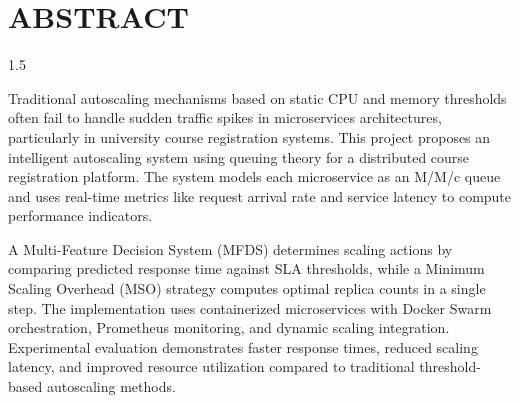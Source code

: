 \chapter*{\uppercase{ABSTRACT}}
\begin{spacing}{1.5}
\begin{sloppypar}


Traditional autoscaling mechanisms based on static CPU and memory thresholds often fail to handle sudden traffic spikes in microservices architectures, particularly in university course registration systems. This project proposes an intelligent autoscaling system using queuing theory for a distributed course registration platform. The system models each microservice as an M/M/c queue and uses real-time metrics like request arrival rate and service latency to compute performance indicators. 

A Multi-Feature Decision System (MFDS) determines scaling actions by comparing predicted response time against SLA thresholds, while a Minimum Scaling Overhead (MSO) strategy computes optimal replica counts in a single step. The implementation uses containerized microservices with Docker Swarm orchestration, Prometheus monitoring, and dynamic scaling integration. Experimental evaluation demonstrates faster response times, reduced scaling latency, and improved resource utilization compared to traditional threshold-based autoscaling methods.
\end{sloppypar}
\end{spacing}
